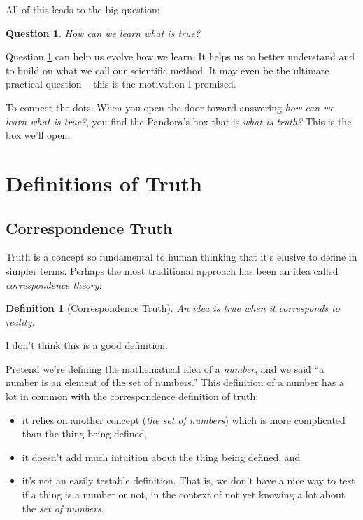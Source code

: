 \documentclass[11pt, oneside]{article}   	%
\newtheorem{question}{Question}
\newtheorem{defn}{Definition}
\begin{document}
All of this leads to the big question:

\begin{question}\label{q2}
    How can we learn what is true?
\end{question}

Question \ref{q2} can help us evolve how we learn.
It helps us to better understand and to build on what we call our
scientific method.
It may even
be the ultimate practical question -- this is the motivation I promised.

To connect the dots: When you open the door toward answering {\em how can we
learn what is true?}, you find the
Pandora's box that is {\em what is truth?} This is the box we'll open.

\section{Definitions of Truth}

\subsection{Correspondence Truth}

Truth is a concept so fundamental to human thinking that it's elusive to define
in simpler terms.
Perhaps the most traditional approach has been an idea called
{\em correspondence theory}\/:

\begin{defn}[Correspondence Truth]\label{d1}
    An idea is true when it corresponds to reality.
\end{defn}

I don't think this is a good definition.

Pretend we're defining the mathematical idea of a {\em number}, and we said
``a number is an element of the set of numbers.'' This definition of a number
has a lot in common with the correspondence definition of truth:
\begin{itemize}
    \item it relies on another concept ({\em the set of numbers})
        which is more complicated than the thing
        being defined, 
    \item it doesn't add much intuition about the thing being defined, and
    \item it's not an easily testable definition. That is, we don't have a nice
        way to test if a thing is a number or not, in the context of not yet
        knowing a lot about the {\em set of numbers}.
\end{itemize}
\end{document}
